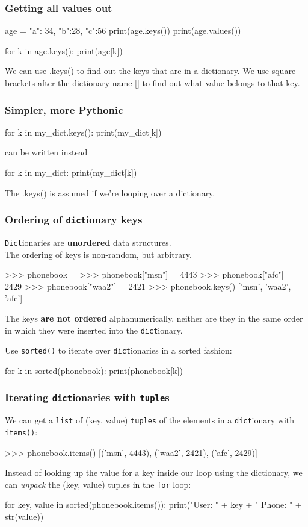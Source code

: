 \documentclass{beamer}
\begin{document}
\begin{frame}[fragile]
\frametitle{Getting all values out}
\begin{code}
age = { "a": 34, "b":28, "c":56 }
print(age.keys())
print(age.values())

for k in age.keys():
   print(age[k])
\end{code}
We can use .keys() to find out the keys that are in a dictionary.
We use square brackets after the dictionary name [] to find
out what value belongs to that key.
\end{frame}

\begin{frame}[fragile]
\frametitle{Simpler, more Pythonic}
\begin{code}
for k in my_dict.keys():
   print(my_dict[k])
\end{code}
can be written instead
\begin{code}
for k in my_dict:
   print(my_dict[k])
\end{code}
The .keys() is assumed if we're looping over a dictionary.
\end{frame}


\begin{frame}[fragile]
\frametitle{Ordering of \texttt{dict}ionary keys}
\texttt{Dict}ionaries are \textbf{unordered} data structures.\\
The ordering of keys is non-random, but arbitrary.
\begin{code}
>>> phonebook = {}
>>> phonebook["msn"] = 4443
>>> phonebook["afc"] = 2429
>>> phonebook["waa2"] = 2421 
>>> phonebook.keys()
['msn', 'waa2', 'afc']
\end{code}
The keys \textbf{are not ordered} alphanumerically, neither are they in the same
order in which they were inserted into the \texttt{dict}ionary.
\vskip 0.3cm

Use \texttt{sorted()} to iterate over \texttt{dict}ionaries in a sorted fashion:
\begin{code}
for k in sorted(phonebook):
   print(phonebook[k])
\end{code}
\end{frame}


\begin{frame}[fragile]
\frametitle{Iterating \texttt{dict}ionaries with \texttt{tuple}s}
We can get a \texttt{list} of (key, value) \texttt{tuples} of the elements
in a \texttt{dict}ionary with \texttt{items()}:
\begin{code}
>>> phonebook.items()
[('msn', 4443), ('waa2', 2421), ('afc', 2429)]
\end{code}

\vskip 0.3cm
Instead of looking up the value for a key inside our loop using the dictionary,
we can \textit{unpack} the (key, value) tuples in the \texttt{for} loop:
\begin{code}
for key, value in sorted(phonebook.items()):
    print("User: " + key + " Phone: " + str(value))
\end{code}
\end{frame}
\end{document}
